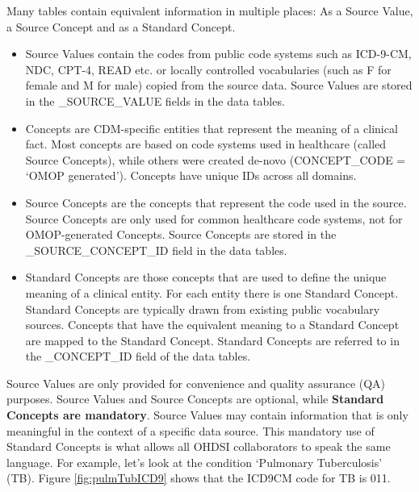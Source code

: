 \documentclass[]{book}
\providecommand{\tightlist}{%
  \setlength{\itemsep}{0pt}\setlength{\parskip}{0pt}}
\begin{document}
Many tables contain equivalent information in multiple places: As a
Source Value, a Source Concept and as a Standard Concept.

\begin{itemize}
\tightlist
\item
  Source Values contain the codes from public code systems such as
  ICD-9-CM, NDC, CPT-4, READ etc. or locally controlled vocabularies
  (such as F for female and M for male) copied from the source data.
  Source Values are stored in the \_SOURCE\_VALUE fields in the data
  tables.
\item
  Concepts are CDM-specific entities that represent the meaning of a
  clinical fact. Most concepts are based on code systems used in
  healthcare (called Source Concepts), while others were created de-novo
  (CONCEPT\_CODE = `OMOP generated'). Concepts have unique IDs across
  all domains.
\item
  Source Concepts are the concepts that represent the code used in the
  source. Source Concepts are only used for common healthcare code
  systems, not for OMOP-generated Concepts. Source Concepts are stored
  in the \_SOURCE\_CONCEPT\_ID field in the data tables.
\item
  Standard Concepts are those concepts that are used to define the
  unique meaning of a clinical entity. For each entity there is one
  Standard Concept. Standard Concepts are typically drawn from existing
  public vocabulary sources. Concepts that have the equivalent meaning
  to a Standard Concept are mapped to the Standard Concept. Standard
  Concepts are referred to in the \_CONCEPT\_ID field of the data
  tables.
\end{itemize}

Source Values are only provided for convenience and quality assurance
(QA) purposes. Source Values and Source Concepts are optional, while
\textbf{Standard Concepts are mandatory}. Source Values may contain
information that is only meaningful in the context of a specific data
source. This mandatory use of Standard Concepts is what allows all OHDSI
collaborators to speak the same language. For example, let's look at the
condition `Pulmonary Tuberculosis' (TB). Figure \ref{fig:pulmTubICD9}
shows that the ICD9CM code for TB is 011.
\end{document}
